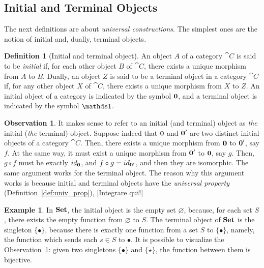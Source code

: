 \documentclass[a4paper, twoside,openright]{report}
\theoremstyle{plain}
\theoremstyle{definition}
\newtheorem{definition}[theorem]{Definition}
\newtheorem{example}[theorem]{Example}
\newtheorem{obs}[theorem]{Observation}
\begin{document}
\subsection{Initial and Terminal Objects}

The next definitions are about \emph{universal constructions}. The simplest ones are the notion of initial and, dually, terminal objects.

\begin{definition}[Initial and terminal object]
    An object $A$ of a category $\cat C$ is said to be \emph{initial} if, for each other object $B$ of $\cat C$, there exists a unique morphism from $A$ to $B$.
    Dually, an object $Z$ is said to be a terminal object in a category $\cat C$ if, for any other object $X$ of $\cat C$, there exists a unique morphism from $X$ to $Z$.
    An initial object of a category is indicated by the symbol $\textbf 0$, and a terminal object is indicated by the symbol $\terminal$.
\end{definition}

\begin{obs}\label{obs:terminal_are_isomorph}
    It makes sense to refer to an initial (and terminal) object as \emph{the} initial (\emph{the} terminal) object. Suppose indeed that $\textbf 0$ and $\textbf 0'$ are two distinct initial objects of a category $\cat C$. Then, there exists a unique morphism from $\textbf 0$ to $\textbf 0'$, say $f$. At the same way, it must exist a unique morphism from $\textbf 0'$ to $\textbf 0$, say $g$. Then, $g\circ f$ must be exactly $id_{\textbf 0}$, and $f \circ g = id_{\textbf 0'}$, and then they are isomorphic. The same argument works for the terminal object.
    The reason why this argument works is because initial and terminal objects have the \emph{universal property} (Definition~\ref{def:univ_prop}), [Integrare qui!]
\end{obs}

\begin{example}\label{ex:set_init_term}
    In $\mathbf{Set}$, the initial object is the empty set $\varnothing$, because, for each set $S$, there exists the empty function from $\varnothing$ to $S$. The terminal object of $\mathbf{Set}$ is the singleton $\{ \bullet \}$, because there is exactly one function from a set $S$ to $\{ \bullet \}$, namely, the function which sends each $s \in S$ to $\bullet$. It is possible to visualize the Observation~\ref{obs:terminal_are_isomorph}: given two singletons $\{ \bullet \}$ and $\{ \star \}$, the function between them is bijective.
\end{example}
\end{document}
